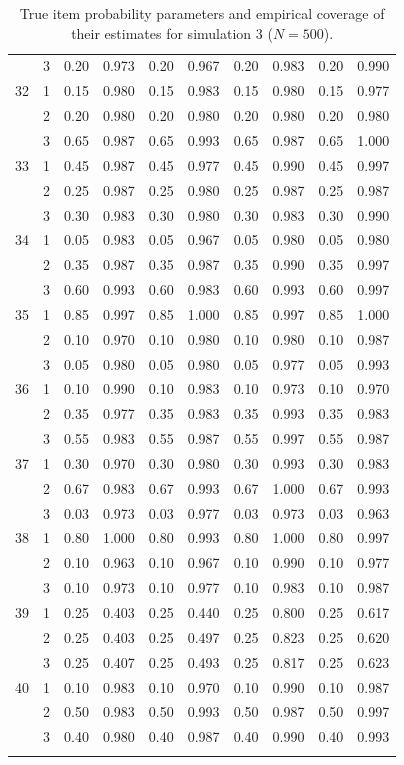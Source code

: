 \begin{longtable}{llcccccccc}
   & 3 & 0.20 & 0.973 & 0.20 & 0.967 & 0.20 & 0.983 & 0.20 & 0.990 \\ 
  32 & 1 & 0.15 & 0.980 & 0.15 & 0.983 & 0.15 & 0.980 & 0.15 & 0.977 \\ 
   & 2 & 0.20 & 0.980 & 0.20 & 0.980 & 0.20 & 0.980 & 0.20 & 0.980 \\ 
   & 3 & 0.65 & 0.987 & 0.65 & 0.993 & 0.65 & 0.987 & 0.65 & 1.000 \\ 
  33 & 1 & 0.45 & 0.987 & 0.45 & 0.977 & 0.45 & 0.990 & 0.45 & 0.997 \\ 
   & 2 & 0.25 & 0.987 & 0.25 & 0.980 & 0.25 & 0.987 & 0.25 & 0.987 \\ 
   & 3 & 0.30 & 0.983 & 0.30 & 0.980 & 0.30 & 0.983 & 0.30 & 0.990 \\ 
  34 & 1 & 0.05 & 0.983 & 0.05 & 0.967 & 0.05 & 0.980 & 0.05 & 0.980 \\ 
   & 2 & 0.35 & 0.987 & 0.35 & 0.987 & 0.35 & 0.990 & 0.35 & 0.997 \\ 
   & 3 & 0.60 & 0.993 & 0.60 & 0.983 & 0.60 & 0.993 & 0.60 & 0.997 \\ 
  35 & 1 & 0.85 & 0.997 & 0.85 & 1.000 & 0.85 & 0.997 & 0.85 & 1.000 \\ 
   & 2 & 0.10 & 0.970 & 0.10 & 0.980 & 0.10 & 0.980 & 0.10 & 0.987 \\ 
   & 3 & 0.05 & 0.980 & 0.05 & 0.980 & 0.05 & 0.977 & 0.05 & 0.993 \\ 
  36 & 1 & 0.10 & 0.990 & 0.10 & 0.983 & 0.10 & 0.973 & 0.10 & 0.970 \\ 
   & 2 & 0.35 & 0.977 & 0.35 & 0.983 & 0.35 & 0.993 & 0.35 & 0.983 \\ 
   & 3 & 0.55 & 0.983 & 0.55 & 0.987 & 0.55 & 0.997 & 0.55 & 0.987 \\ 
  37 & 1 & 0.30 & 0.970 & 0.30 & 0.980 & 0.30 & 0.993 & 0.30 & 0.983 \\ 
   & 2 & 0.67 & 0.983 & 0.67 & 0.993 & 0.67 & 1.000 & 0.67 & 0.993 \\ 
   & 3 & 0.03 & 0.973 & 0.03 & 0.977 & 0.03 & 0.973 & 0.03 & 0.963 \\ 
  38 & 1 & 0.80 & 1.000 & 0.80 & 0.993 & 0.80 & 1.000 & 0.80 & 0.997 \\ 
   & 2 & 0.10 & 0.963 & 0.10 & 0.967 & 0.10 & 0.990 & 0.10 & 0.977 \\ 
   & 3 & 0.10 & 0.973 & 0.10 & 0.977 & 0.10 & 0.983 & 0.10 & 0.987 \\ 
  39 & 1 & 0.25 & 0.403 & 0.25 & 0.440 & 0.25 & 0.800 & 0.25 & 0.617 \\ 
   & 2 & 0.25 & 0.403 & 0.25 & 0.497 & 0.25 & 0.823 & 0.25 & 0.620 \\ 
   & 3 & 0.25 & 0.407 & 0.25 & 0.493 & 0.25 & 0.817 & 0.25 & 0.623 \\ 
  40 & 1 & 0.10 & 0.983 & 0.10 & 0.970 & 0.10 & 0.990 & 0.10 & 0.987 \\ 
   & 2 & 0.50 & 0.983 & 0.50 & 0.993 & 0.50 & 0.987 & 0.50 & 0.997 \\ 
   & 3 & 0.40 & 0.980 & 0.40 & 0.987 & 0.40 & 0.990 & 0.40 & 0.993 \\ 
   \bottomrule
\caption{True item probability parameters and empirical coverage of their estimates for simulation 3 ($N = 500$).} 
\label{table:sim3_item_prob_coverage_N500}
\end{longtable}
